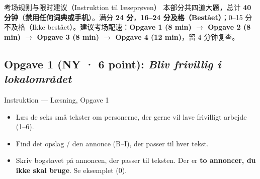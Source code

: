 

\begin{tipbox}{考场规则与限时建议（Instruktion til læseprøven）}
\small
本部分共四道大题，总计 \textbf{40 分钟}（\textbf{禁用任何词典或手机}）。满分 \textbf{24 分}，\textbf{16--24 分及格（Bestået）}；0--15 分不及格（Ikke bestået）。建议考场配速：\textbf{Opgave 1 (8 min) $\rightarrow$ Opgave 2 (8 min) $\rightarrow$ Opgave 3 (8 min) $\rightarrow$ Opgave 4 (12 min)}，留 4 分钟复查。
\end{tipbox}

\subsection*{Opgave 1 (NY · 6 point): \textit{Bliv frivillig i lokalområdet}}

\begin{grammatikbox}{Instruktion — Læsning, Opgave 1}
\small
\begin{itemize}
  \item Læs de seks små tekster om personerne, der gerne vil lave frivilligt arbejde (1--6).
  \item Find det opslag / den annonce (B--I), der passer til hver tekst.
  \item Skriv bogstavet på annoncen, der passer til teksten. Der er \textbf{to annoncer, du ikke skal bruge}. Se eksemplet (0).
\end{itemize}
\end{grammatikbox}

